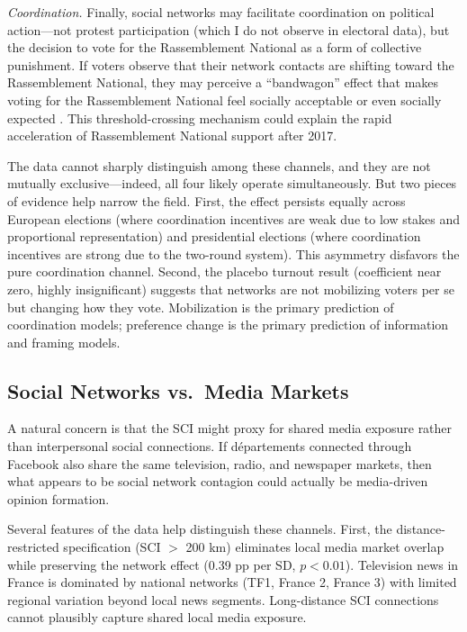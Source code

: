 \documentclass[12pt]{article}
\newcommand{\rn}{Rassemblement National}
\newcommand{\depts}{d\'{e}partements}
\begin{document}
\textit{Coordination.} Finally, social networks may facilitate coordination on political action---not protest participation (which I do not observe in electoral data), but the decision to vote for the \rn{} as a form of collective punishment. If voters observe that their network contacts are shifting toward the \rn{}, they may perceive a ``bandwagon'' effect that makes voting for the \rn{} feel socially acceptable or even socially expected \citep{cantoni2019protests, enikolopov2020social}. This threshold-crossing mechanism \citep{granovetter1978threshold} could explain the rapid acceleration of \rn{} support after 2017.

The data cannot sharply distinguish among these channels, and they are not mutually exclusive---indeed, all four likely operate simultaneously. But two pieces of evidence help narrow the field. First, the effect persists equally across European elections (where coordination incentives are weak due to low stakes and proportional representation) and presidential elections (where coordination incentives are strong due to the two-round system). This asymmetry disfavors the pure coordination channel. Second, the placebo turnout result (coefficient near zero, highly insignificant) suggests that networks are not mobilizing voters per se but changing how they vote. Mobilization is the primary prediction of coordination models; preference change is the primary prediction of information and framing models.

\subsection{Social Networks vs.\ Media Markets}

A natural concern is that the SCI might proxy for shared media exposure rather than interpersonal social connections. If \depts{} connected through Facebook also share the same television, radio, and newspaper markets, then what appears to be social network contagion could actually be media-driven opinion formation.

Several features of the data help distinguish these channels. First, the distance-restricted specification (SCI $>$ 200 km) eliminates local media market overlap while preserving the network effect (0.39 pp per SD, $p < 0.01$). Television news in France is dominated by national networks (TF1, France 2, France 3) with limited regional variation beyond local news segments. Long-distance SCI connections cannot plausibly capture shared local media exposure.
\end{document}

